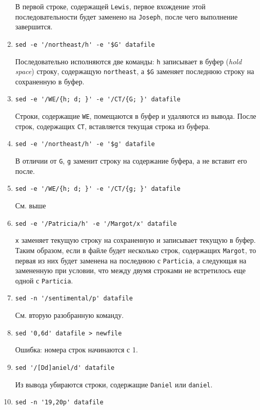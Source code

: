 \documentclass[listings]{labreport}
\begin{document}
\begin{enumerate}
В первой строке, содержащей \verb|Lewis|, первое вхождение этой последовательности
будет заменено на \verb|Joseph|, после чего выполнение завершится.

\item \verb|sed -e '/northeast/h' -e '$G' datafile|

Последовательно исполняются две команды: \verb|h| записывает в буфер (\textit{hold space})
строку, содержащую \verb|northeast|, а \verb|$G| заменяет последнюю строку на сохраненную
в буфер.

\item \verb|sed -e '/WE/{h; d; }' -e '/CT/{G; }' datafile|

Строки, содержащие \verb|WE|, помещаются в буфер и удаляются из вывода.
После строк, содержащих \verb|CT|, вставляется текущая строка из буфера.

\item \verb|sed -e '/northeast/h' -e '$g' datafile|

В отличии от \verb|G|, \verb|g| заменит строку на содержание буфера, а не
вставит его после.

\item \verb|sed -e '/WE/{h; d; }' -e '/CT/{g; }' datafile|

См. выше

\item \verb|sed -e '/Patricia/h' -e '/Margot/x' datafile|

\verb|x| заменяет текущую строку на сохраненную и записывает текущую в буфер.
Таким образом, если в файле будет несколько строк, содержащих \verb|Margot|,
то первая из них будет заменена на последнюю с \verb|Particia|, а следующая
на замененную при условии, что между двумя строками не встретилось еще одной
с \verb|Particia|.

\item \verb|sed -n '/sentimental/p' datafile|

См. вторую разобранную команду.

\item \verb|sed '0,6d' datafile > newfile|

Ошибка: номера строк начинаются с 1.

\item \verb|sed '/[Dd]aniel/d' datafile|

Из вывода убираются строки, содержащие \verb|Daniel| или \verb|daniel|.

\item \verb|sed -n '19,20p' datafile|


\end{enumerate}
\end{document}
